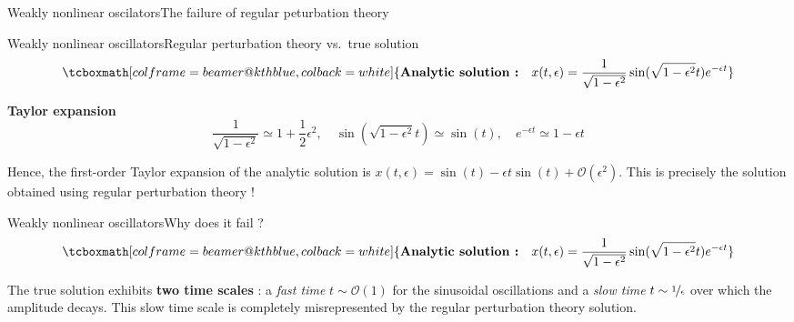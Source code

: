 \documentclass[usenames,dvipsnames,svgnames,10pt,aspectratio=169]{beamer}
\begin{document}
\begin{frame}[t, c]{Weakly nonlinear oscilators}{The failure of regular peturbation theory}
  \centering


  \bigskip


\end{frame}




\begin{frame}[t, c]{Weakly nonlinear oscillators}{Regular perturbation theory vs.\ true solution}
  \[
  \tcboxmath[colframe=beamer@kthblue, colback=white]{\textbf{Analytic solution :} \quad x(t, \epsilon) = \dfrac{1}{\sqrt{1 - \epsilon^2}} \sin(\sqrt{1 - \epsilon^2} t) e^{-\epsilon t}}
  \]

  \bigskip

  \begin{overprint}
    \centering \textbf{Taylor expansion}
    \[
    \dfrac{1}{\sqrt{1 - \epsilon^2}} \simeq 1 + \dfrac{1}{2} \epsilon^2, \quad \sin(\sqrt{1 - \epsilon^2}t) \simeq \sin(t), \quad  e^{-\epsilon t} \simeq 1 - \epsilon t
    \]


    Hence, the first-order Taylor expansion of the analytic solution is \( x(t, \epsilon) = \sin(t) - \epsilon t \sin(t) + \mathcal{O}(\epsilon^2) \).
    This is precisely the solution obtained using regular perturbation theory !

  \end{overprint}
\end{frame}




\begin{frame}[t, c]{Weakly nonlinear oscillators}{Why does it fail ?}
  \[
  \tcboxmath[colframe=beamer@kthblue, colback=white]{\textbf{Analytic solution :} \quad x(t, \epsilon) = \dfrac{1}{\sqrt{1 - \epsilon^2}} \sin(\sqrt{1 - \epsilon^2} t) e^{-\epsilon t}}
  \]

  \bigskip

  The true solution exhibits \alert{\textbf{two time scales}} : a \emph{fast time} $t \sim \mathcal{O}(1)$ for the sinusoidal oscillations and a \emph{slow time} $t \sim \nicefrac{1}{\epsilon}$ over which the amplitude decays.
  This slow time scale is completely misrepresented by the regular perturbation theory solution.

\end{frame}
\end{document}

